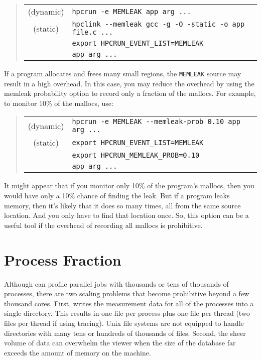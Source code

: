 \begin{quote}
\begin{tabular}{@{}cl}
(dynamic) & \verb|hpcrun -e MEMLEAK app arg ...| \\
(static)  & \verb|hpclink --memleak gcc -g -O -static -o app file.c ...| \\
& \verb|export HPCRUN_EVENT_LIST=MEMLEAK| \\
& \verb|app arg ...|
\end{tabular}
\end{quote}

If a program allocates and frees many small regions, the {\tt MEMLEAK}
source may result in a high overhead.  In this case, you may reduce
the overhead by using the memleak probability option to record only a
fraction of the mallocs.  For example, to monitor 10\% of the mallocs,
use:

\begin{quote}
\begin{tabular}{@{}cl}
(dynamic) & \verb|hpcrun -e MEMLEAK --memleak-prob 0.10 app arg ...| \\
(static)  & \verb|export HPCRUN_EVENT_LIST=MEMLEAK| \\
& \verb|export HPCRUN_MEMLEAK_PROB=0.10| \\
& \verb|app arg ...|
\end{tabular}
\end{quote}

It might appear that if you monitor only 10\% of the program's
mallocs, then you would have only a 10\% chance of finding the leak.
But if a program leaks memory, then it's likely that it does so many
times, all from the same source location.  And you only have to find
that location once.  So, this option can be a useful tool if the
overhead of recording all mallocs is prohibitive.


\section{Process Fraction}

Although \hpcrun{} can profile parallel jobs with thousands or tens of
thousands of processes, there are two scaling problems that become
prohibitive beyond a few thousand cores.  First, \hpcrun{} writes the
measurement data for all of the processes into a single directory.
This results in one file per process plus one file per thread (two
files per thread if using tracing).  Unix file systems are not
equipped to handle directories with many tens or hundreds of thousands
of files.  Second, the sheer volume of data can overwhelm the viewer
when the size of the database far exceeds the amount of memory on the
machine.

